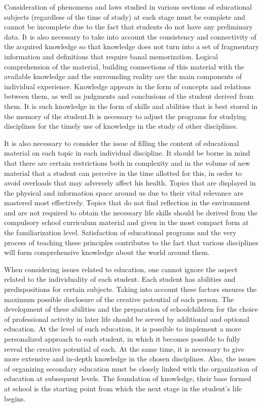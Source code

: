 \documentclass[a4paper, 10pt,twocolumn]{article}
\begin{document}
Consideration of phenomena and laws studied in various sections of educational subjects (regardless of the
time of study) at each stage must be complete and cannot
be incomplete due to the fact that students do not have
any preliminary data. It is also necessary to take into
account the consistency and connectivity of the acquired
knowledge so that knowledge does not turn into a set
of fragmentary information and definitions that require
banal memorization. Logical comprehension of the material, building connections of this material with the
available knowledge and the surrounding reality are the
main components of individual experience. Knowledge
appears in the form of concepts and relations between
them, as well as judgments and conclusions of the student
derived from them. It is such knowledge in the form of
skills and abilities that is best stored in the memory of the
student.It is necessary to adjust the programs for studying
disciplines for the timely use of knowledge in the study
of other disciplines.

It is also necessary to consider the issue of filling the
content of educational material on each topic in each
individual discipline. It should be borne in mind that
there are certain restrictions both in complexity and in
the volume of new material that a student can perceive in
the time allotted for this, in order to avoid overloads that
may adversely affect his health. Topics that are displayed
in the physical and information space around us due to
their vital relevance are mastered most effectively. Topics
that do not find reflection in the environment and are
not required to obtain the necessary life skills should be
derived from the compulsory school curriculum material
and given in the most compact form at the familiarization
level. Satisfaction of educational programs and the very
process of teaching these principles contributes to the
fact that various disciplines will form comprehensive
knowledge about the world around them.

When considering issues related to education, one
cannot ignore the aspect related to the individuality of
each student. Each student has abilities and predispositions for certain subjects. Taking into account these
factors ensures the maximum possible disclosure of the
creative potential of each person. The development of
these abilities and the preparation of schoolchildren for
the choice of professional activity in later life should be
served by additional and optional education. At the level
of such education, it is possible to implement a more personalized approach to each student, in which it becomes
possible to fully reveal the creative potential of each. At
the same time, it is necessary to give more extensive and
in-depth knowledge in the chosen disciplines. Also, the
issues of organizing secondary education must be closely
linked with the organization of education at subsequent
levels. The foundation of knowledge, their base formed
at school is the starting point from which the next stage
in the student’s life begins.
\end{document}

